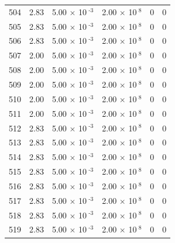 \documentclass[a4paper,11pt]{article}
\begin{document}
\begin{center}
\begin{longtable}{|R{1.5cm}|R{2.4cm}|R{2.4cm}|R{2.4cm}|R{2.4cm}|R{2.4cm}|}
  504 &   2.83  &         5.00 $\times$ 10$^{\text{          -3}}$  &         2.00 $\times$ 10$^{\text{           8}}$  & 0  & 0 \\
  505 &   2.83  &         5.00 $\times$ 10$^{\text{          -3}}$  &         2.00 $\times$ 10$^{\text{           8}}$  & 0  & 0 \\
  506 &   2.83  &         5.00 $\times$ 10$^{\text{          -3}}$  &         2.00 $\times$ 10$^{\text{           8}}$  & 0  & 0 \\
  507 &   2.00  &         5.00 $\times$ 10$^{\text{          -3}}$  &         2.00 $\times$ 10$^{\text{           8}}$  & 0  & 0 \\
  508 &   2.00  &         5.00 $\times$ 10$^{\text{          -3}}$  &         2.00 $\times$ 10$^{\text{           8}}$  & 0  & 0 \\
  509 &   2.00  &         5.00 $\times$ 10$^{\text{          -3}}$  &         2.00 $\times$ 10$^{\text{           8}}$  & 0  & 0 \\
  510 &   2.00  &         5.00 $\times$ 10$^{\text{          -3}}$  &         2.00 $\times$ 10$^{\text{           8}}$  & 0  & 0 \\
  511 &   2.00  &         5.00 $\times$ 10$^{\text{          -3}}$  &         2.00 $\times$ 10$^{\text{           8}}$  & 0  & 0 \\
  512 &   2.83  &         5.00 $\times$ 10$^{\text{          -3}}$  &         2.00 $\times$ 10$^{\text{           8}}$  & 0  & 0 \\
  513 &   2.83  &         5.00 $\times$ 10$^{\text{          -3}}$  &         2.00 $\times$ 10$^{\text{           8}}$  & 0  & 0 \\
  514 &   2.83  &         5.00 $\times$ 10$^{\text{          -3}}$  &         2.00 $\times$ 10$^{\text{           8}}$  & 0  & 0 \\
  515 &   2.83  &         5.00 $\times$ 10$^{\text{          -3}}$  &         2.00 $\times$ 10$^{\text{           8}}$  & 0  & 0 \\
  516 &   2.83  &         5.00 $\times$ 10$^{\text{          -3}}$  &         2.00 $\times$ 10$^{\text{           8}}$  & 0  & 0 \\
  517 &   2.83  &         5.00 $\times$ 10$^{\text{          -3}}$  &         2.00 $\times$ 10$^{\text{           8}}$  & 0  & 0 \\
  518 &   2.83  &         5.00 $\times$ 10$^{\text{          -3}}$  &         2.00 $\times$ 10$^{\text{           8}}$  & 0  & 0 \\
  519 &   2.83  &         5.00 $\times$ 10$^{\text{          -3}}$  &         2.00 $\times$ 10$^{\text{           8}}$  & 0  & 0 \\

\end{longtable}
\end{center}
\end{document}
